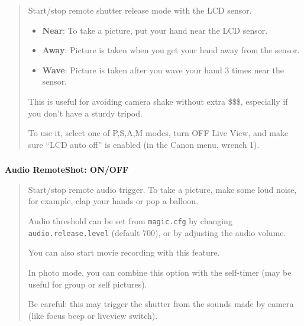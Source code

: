 \documentclass[a4paper,english]{article}
\begin{document}
\begin{quote}

Start/stop remote shutter release mode with the LCD sensor.
%
\begin{itemize}

\item \textbf{Near}: To take a picture, put your hand near the LCD sensor.

\item \textbf{Away}: Picture is taken when you get your hand away from the sensor.

\item \textbf{Wave}: Picture is taken after you wave your hand 3 times near the sensor.

\end{itemize}

This is useful for avoiding camera shake without extra \$\$\$,
especially if you don't have a sturdy tripod.

To use it, select one of P,S,A,M modes, turn OFF Live View,
and make sure ``LCD auto off'' is enabled (in the Canon menu, wrench 1).

\end{quote}
\vspace{-10mm}\subsubsection*{}\label{audio-trigger}
\textbf{Audio RemoteShot: ON/OFF}
%
\begin{quote}

Start/stop remote audio trigger. To take a picture, make some loud noise, for example, clap your hands or pop a balloon.

Audio threshold can be set from \texttt{magic.cfg} by changing \texttt{audio.release.level} (default 700), or by adjusting the audio volume.

You can also start movie recording with this feature.

In photo mode, you can combine this option with the self-timer (may be useful for group or self pictures).

Be careful: this may trigger the shutter from the sounds made by camera (like focus beep or liveview switch).

\end{quote}
\end{document}
